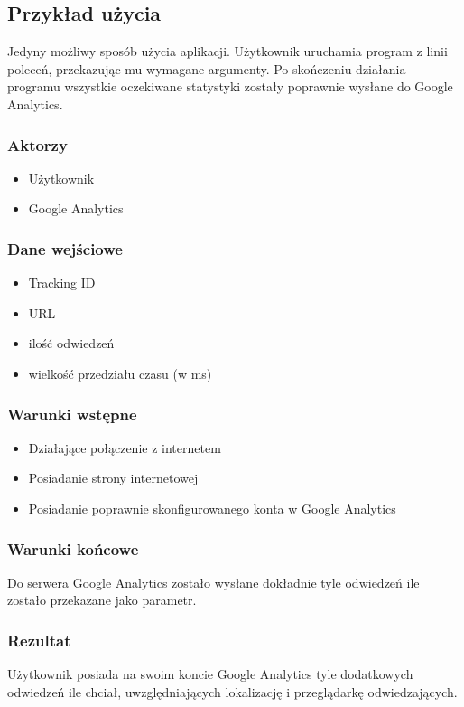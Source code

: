 \documentclass{article}
\begin{document}
\subsection{Przykład użycia}
Jedyny możliwy sposób użycia aplikacji. Użytkownik uruchamia program z linii poleceń, przekazując mu wymagane argumenty. Po skończeniu działania programu wszystkie oczekiwane statystyki zostały poprawnie wysłane do Google Analytics.

\subsubsection{Aktorzy}
\begin{itemize}
\item Użytkownik
\item Google Analytics
\end{itemize}

\subsubsection{Dane wejściowe}
\begin{itemize}
\item Tracking ID
\item URL
\item ilość odwiedzeń
\item wielkość przedziału czasu (w ms)
\end{itemize}

\subsubsection{Warunki wstępne}
\begin{itemize}
\item Działające połączenie z internetem
\item Posiadanie strony internetowej
\item Posiadanie poprawnie skonfigurowanego konta w Google Analytics
\end{itemize}

\subsubsection{Warunki końcowe}
Do serwera Google Analytics zostało wysłane dokładnie tyle odwiedzeń ile zostało przekazane jako parametr.

\subsubsection{Rezultat}
Użytkownik posiada na swoim koncie Google Analytics tyle dodatkowych odwiedzeń ile chciał, uwzględniających lokalizację i przeglądarkę odwiedzających.
\end{document}
